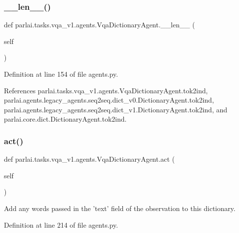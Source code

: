 \subsubsection{\texorpdfstring{\+\_\+\+\_\+len\+\_\+\+\_\+()}{\_\_len\_\_()}}
{\footnotesize\ttfamily def parlai.\+tasks.\+vqa\+\_\+v1.\+agents.\+Vqa\+Dictionary\+Agent.\+\_\+\+\_\+len\+\_\+\+\_\+ (\begin{DoxyParamCaption}\item[{}]{self }\end{DoxyParamCaption})}



Definition at line 154 of file agents.\+py.



References parlai.\+tasks.\+vqa\+\_\+v1.\+agents.\+Vqa\+Dictionary\+Agent.\+tok2ind, parlai.\+agents.\+legacy\+\_\+agents.\+seq2seq.\+dict\+\_\+v0.\+Dictionary\+Agent.\+tok2ind, parlai.\+agents.\+legacy\+\_\+agents.\+seq2seq.\+dict\+\_\+v1.\+Dictionary\+Agent.\+tok2ind, and parlai.\+core.\+dict.\+Dictionary\+Agent.\+tok2ind.

\mbox{\label{classparlai_1_1tasks_1_1vqa__v1_1_1agents_1_1VqaDictionaryAgent_af491fa3e37b0ff66ce8feb0c6ea7da16}} 
\subsubsection{\texorpdfstring{act()}{act()}}
{\footnotesize\ttfamily def parlai.\+tasks.\+vqa\+\_\+v1.\+agents.\+Vqa\+Dictionary\+Agent.\+act (\begin{DoxyParamCaption}\item[{}]{self }\end{DoxyParamCaption})}

\begin{DoxyVerb}Add any words passed in the 'text' field of the observation to this
dictionary.
\end{DoxyVerb}
 

Definition at line 214 of file agents.\+py.



